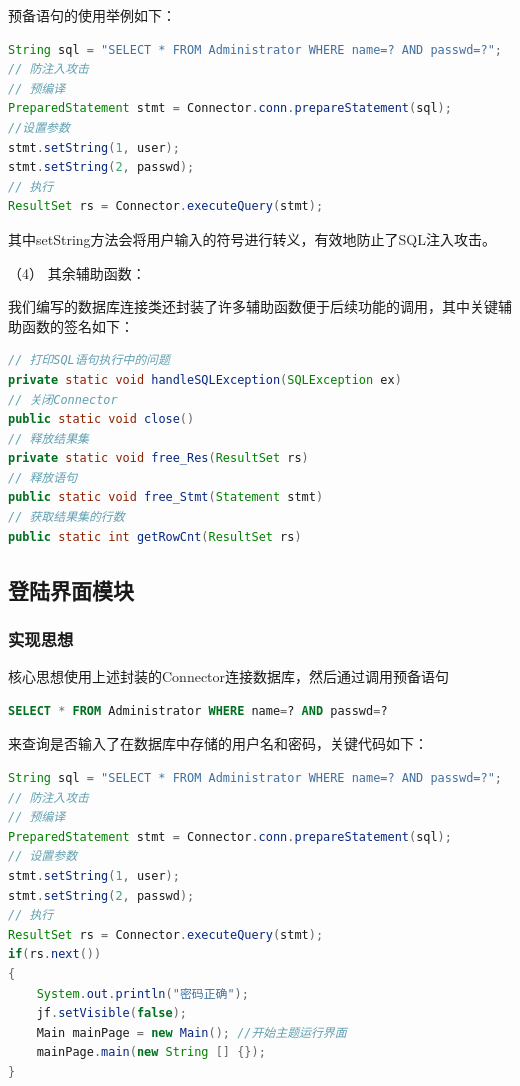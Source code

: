 \documentclass[withoutpreface,bwprint]{cumcmthesis} %
\newcommand{\kuohao}[1]{ \noindent （#1）}
\begin{document}
\noindent
预备语句的使用举例如下：
\begin{lstlisting}[language=java]
String sql = "SELECT * FROM Administrator WHERE name=? AND passwd=?";
// 防注入攻击
// 预编译
PreparedStatement stmt = Connector.conn.prepareStatement(sql);
//设置参数
stmt.setString(1, user);
stmt.setString(2, passwd);
// 执行
ResultSet rs = Connector.executeQuery(stmt);
\end{lstlisting}
其中setString方法会将用户输入的符号进行转义，有效地防止了SQL注入攻击。

\vspace{1em}
\kuohao{4} 其余辅助函数：

我们编写的数据库连接类还封装了许多辅助函数便于后续功能的调用，其中关键辅助函数的签名如下：
\begin{lstlisting}[language=java]
// 打印SQL语句执行中的问题
private static void handleSQLException(SQLException ex)
// 关闭Connector
public static void close()
// 释放结果集
private static void free_Res(ResultSet rs)
// 释放语句
public static void free_Stmt(Statement stmt)
// 获取结果集的行数
public static int getRowCnt(ResultSet rs)
\end{lstlisting}

\subsection{登陆界面模块}

\subsubsection{实现思想}
核心思想使用上述封装的Connector连接数据库，然后通过调用预备语句
\begin{lstlisting}[language=SQL]
SELECT * FROM Administrator WHERE name=? AND passwd=?
\end{lstlisting}
来查询是否输入了在数据库中存储的用户名和密码，关键代码如下：
\begin{lstlisting}[language=java]
String sql = "SELECT * FROM Administrator WHERE name=? AND passwd=?";
// 防注入攻击
// 预编译
PreparedStatement stmt = Connector.conn.prepareStatement(sql);
// 设置参数
stmt.setString(1, user);
stmt.setString(2, passwd);
// 执行
ResultSet rs = Connector.executeQuery(stmt);
if(rs.next())
{
    System.out.println("密码正确");
    jf.setVisible(false);
    Main mainPage = new Main(); //开始主题运行界面
    mainPage.main(new String [] {});
}		
\end{lstlisting}
\end{document}
